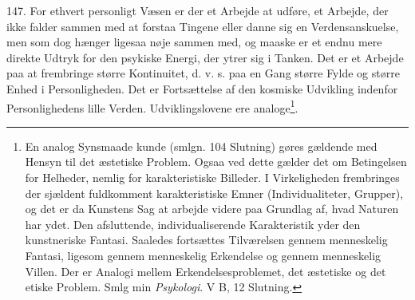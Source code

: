 \documentclass[12pt,a4paper]{book}
\begin{document}
147. For ethvert personligt Væsen er der et Arbejde at udføre, et Arbejde, der ikke falder
sammen med at forstaa Tingene eller danne sig en Verdensanskuelse, men som dog hænger
ligesaa nøje sammen med, og maaske er et endnu mere direkte Udtryk for den psykiske Energi,
der ytrer sig i Tanken. Det er et Arbejde paa at frembringe større Kontinuitet, d. v. s.
paa en Gang større Fylde og større Enhed i Personligheden. Det er Fortsættelse af den
kosmiske Udvikling indenfor Personlighedens lille Verden. Udviklingslovene ere
analoge\footnote{En analog Synsmaade kunde (smlgn. 104 Slutning) gøres gældende med Hensyn
til det æstetiske Problem. Ogsaa ved dette gælder det om Betingelsen for Helheder, nemlig
for karakteristiske Billeder. I Virkeligheden frembringes der sjældent fuldkomment karakteristiske Emner (Individualiteter, Grupper), og det er da Kunstens Sag at arbejde
videre paa Grundlag af, hvad Naturen har ydet. Den afsluttende, individualiserende
Karakteristik yder den kunstneriske Fantasi. Saaledes fortsættes Tilværelsen gennem
menneskelig Fantasi, ligesom gennem menneskelig Erkendelse og gennem menneskelig Villen.
Der er Analogi mellem Erkendelsesproblemet, det æstetiske og det etiske Problem. Smlg min
\emph{Psykologi}. V B, 12 Slutning.}.
\end{document}
